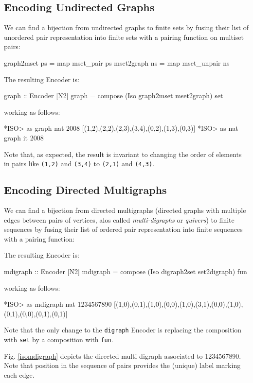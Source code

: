 \documentclass[]{INCLUDES/llncs}
\begin{document}
\subsection{Encoding Undirected Graphs} \label{ugraphs}
We can find a bijection from 
undirected graphs to finite sets by fusing their list
 of unordered pair representation into finite sets with a pairing
 function on multiset pairs:
\begin{code}
graph2mset ps = map mset_pair ps
mset2graph ns = map mset_unpair ns
\end{code}
The resulting Encoder is:
\begin{code}
graph :: Encoder [N2]
graph = compose (Iso graph2mset mset2graph) set
\end{code}
working as follows:
\begin{codex}
*ISO> as graph nat 2008
[(1,2),(2,2),(2,3),(3,4),(0,2),(1,3),(0,3)]
*ISO> as nat graph it
2008
\end{codex}
Note that, as expected, the result is invariant to changing the order of
elements in pairs like {\tt (1,2)} and {\tt (3,4)} to {\tt (2,1)} and
{\tt (4,3)}.

\subsection{Encoding Directed Multigraphs} \label{mdigraphs}
We can find a bijection from 
directed multigraphs (directed graphs with multiple edges between pairs of
vertices, alos called {\em multi-digraphs} or {\em quivers}) to finite sequences
by fusing their list of ordered pair representation into finite sequences 
with a pairing function:

The resulting Encoder is:
\begin{code}
mdigraph :: Encoder [N2]
mdigraph = compose (Iso digraph2set set2digraph) fun
\end{code}
working as follows:
\begin{codex}
*ISO> as mdigraph  nat 1234567890
[(1,0),(0,1),(1,0),(0,0),(1,0),(3,1),(0,0),(1,0),(0,1),(0,0),(0,1),(0,1)]
\end{codex}
Note that the only change to the {\tt digraph} Encoder is replacing
the composition with {\tt set} by a composition with {\tt fun}.

Fig. \ref{isomdigraph} depicts the directed multi-digraph associated to
1234567890. Note that position in the sequence of pairs provides the (unique) label marking
each edge.
 
\end{document}
